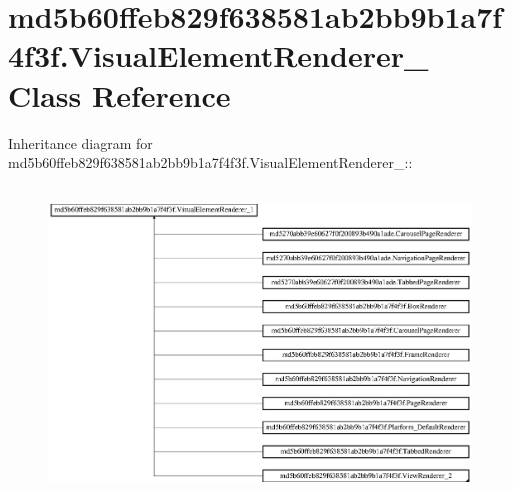 \hypertarget{classmd5b60ffeb829f638581ab2bb9b1a7f4f3f_1_1_visual_element_renderer__1}{
\section{md5b60ffeb829f638581ab2bb9b1a7f4f3f.VisualElementRenderer\_ Class Reference}
\label{classmd5b60ffeb829f638581ab2bb9b1a7f4f3f_1_1_visual_element_renderer__1}
}
Inheritance diagram for md5b60ffeb829f638581ab2bb9b1a7f4f3f.VisualElementRenderer\_::\begin{figure}[H]
\begin{center}
\leavevmode
\includegraphics[height=8.25553cm]{classmd5b60ffeb829f638581ab2bb9b1a7f4f3f_1_1_visual_element_renderer__1}
\end{center}
\end{figure}
